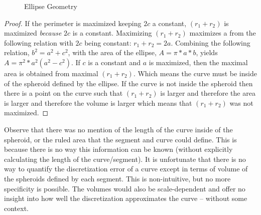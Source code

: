 \begin{figure}[h!]
  \caption{\label{fig:EllipseGeometry} Ellipse Geometry \cite{weissteineSagitta}}
\end{figure}

\begin{proof}
If the perimeter is maximized keeping $2c$ a constant, $(r_1 + r_2)$ is 
maximized \textit{because} $2c$ is a constant.  Maximizing $(r_1+r_2)$ 
maximizes a from the following relation with $2c$ being constant: $r_1 + 
r_2 = 2a$.  Combining the following relation, $b^2 = a^2 + c^2$, with the 
area of the ellipse, $A = \pi * a * b$, yields $A=\pi^{2}*a^{2}(a^{2} - 
c^2)$.  If $c$ is a constant and $a$ is maximized, then the maximal area 
is obtained from maximal $(r_1+r_2)$.  Which means the curve must be 
inside of the spheroid defined by the ellipse.  If the curve is not inside 
the spheroid then there is a point on the curve such that $(r_1+r_2)$ is 
larger and therefore the area is larger and therefore the volume is larger 
which means that $(r_1+r_2)$ was not maximized.
\end{proof}

Observe that there was no mention of the length of the curve inside of the 
spheroid, or the ruled area that the segment and curve could define.  
This is because there is no way this information can be known (without 
explicitly calculating the length of the curve/segment).  It is 
unfortunate that there is no way to quantify the discretization error of a 
curve except in terms of volume of the spheroids defined by each segment.  
This is non-intuitive, but no more specificity is possible.  The volumes 
would also be scale-dependent and offer no insight into how well the 
discretization approximates the curve -- without some context.
